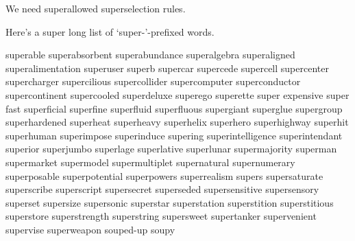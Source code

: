 We need superallowed superselection rules.

Here's a super long list of `super-'-prefixed words.

superable
superabsorbent
superabundance
superalgebra
superaligned
superalimentation
superuser
superb
supercar
supercede
supercell
supercenter
supercharger
supercilious
supercollider
supercomputer
superconductor
supercontinent
supercooled
superdeluxe
superego
superette
super expensive
super fast
superficial
superfine
superfluid
superfluous
supergiant
superglue
supergroup
superhardened
superheat
superheavy
superhelix
superhero
superhighway
superhit
superhuman
superimpose
superinduce
supering
superintelligence
superintendant
superior
superjumbo
superlage
superlative
superlunar
supermajority
superman
supermarket
supermodel
supermultiplet
supernatural
supernumerary
superposable
superpotential
superpowers
superrealism
supers
supersaturate
superscribe
superscript
supersecret
superseded
supersensitive
supersensory
superset
supersize
supersonic
superstar
superstation
superstition
superstitious
superstore
superstrength
superstring
supersweet
supertanker
supervenient
supervise
superweapon
souped-up
soupy
